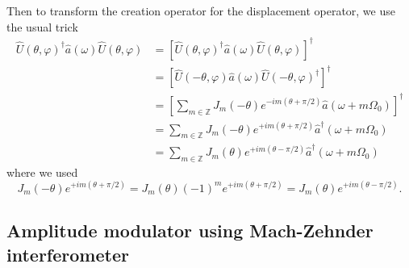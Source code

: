 Then to transform the creation operator for the displacement operator, we use the usual trick
\begin{equation}
	\begin{split}
		\hat{U}(\theta,\varphi)^\dagger
		\hat{a}(\omega)
		\hat{U}(\theta,\varphi)
		&=
		\left[
			\hat{U}(\theta,\varphi)^\dagger
			\hat{a}(\omega)
			\hat{U}(\theta,\varphi)	
		\right]^\dagger
		\\
		&=
		\left[
			\hat{U}(-\theta,\varphi)
			\hat{a}(\omega)
			\hat{U}(-\theta,\varphi)^\dagger	
		\right]^\dagger
		\\
		&=
		\left[
			\sum_{m\in\mathbb{Z}}
			J_m(-\theta)
			e^{-im(\theta+\pi/2)}
			\hat{a}(\omega+m\Omega_0)
		\right]^\dagger
		\\
		&=
		\sum_{m\in\mathbb{Z}}
		J_m(-\theta)
		e^{+im(\theta+\pi/2)}
		\hat{a}^\dagger(\omega+m\Omega_0)
		\\
		&=
		\sum_{m\in\mathbb{Z}}
		J_m(\theta)
		e^{+im(\theta-\pi/2)}
		\hat{a}^\dagger(\omega+m\Omega_0)
	\end{split}
\end{equation}
where we used
\begin{equation}
	J_m(-\theta)
	e^{+im(\theta+\pi/2)}
	=
	J_m(\theta)
	(-1)^m
	e^{+im(\theta+\pi/2)}
	=
	J_m(\theta)
	e^{+im(\theta-\pi/2)}
	.
\end{equation}

\subsection{Amplitude modulator using Mach-Zehnder interferometer}


